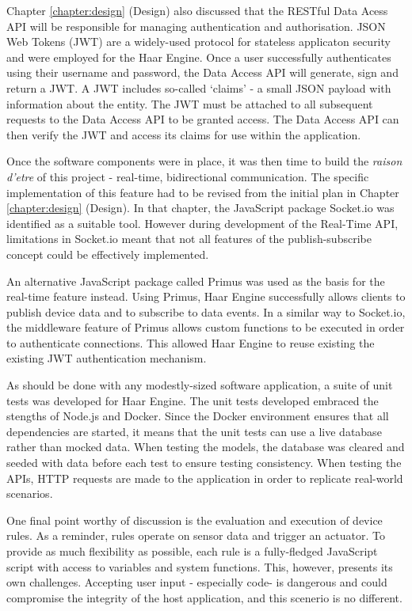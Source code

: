     Chapter \ref{chapter:design} (Design) also discussed that the RESTful Data Acess API will be responsible for managing authentication and authorisation. JSON Web Tokens (JWT) are a widely-used protocol for stateless applicaton security and were employed for the Haar Engine. Once a user successfully authenticates using their username and password, the Data Access API will generate, sign and return a JWT. A JWT includes so-called `claims' - a small JSON payload with information about the entity. The JWT must be attached to all subsequent requests to the Data Access API to be granted access. The Data Access API can then verify the JWT and access its claims for use within the application.

    Once the software components were in place, it was then time to build the \textit{raison d'etre} of this project - real-time, bidirectional communication. The specific implementation of this feature had to be revised from the initial plan in Chapter \ref{chapter:design} (Design). In that chapter, the JavaScript package Socket.io was identified as a suitable tool. However during development of the Real-Time API, limitations in Socket.io meant that not all features of the publish-subscribe concept could be effectively implemented.

    An alternative JavaScript package called Primus was used as the basis for the real-time feature instead. Using Primus, Haar Engine successfully allows clients to publish device data and to subscribe to data events. In a similar way to Socket.io, the middleware feature of Primus allows custom functions to be executed in order to authenticate connections. This allowed Haar Engine to reuse existing the existing JWT authentication mechanism.

    As should be done with any modestly-sized software application, a suite of unit tests was developed for Haar Engine. The unit tests developed embraced the stengths of Node.js and Docker. Since the Docker environment ensures that all dependencies are started, it means that the unit tests can use a live database rather than mocked data. When testing the models, the database was cleared and seeded with data before each test to ensure testing consistency. When testing the APIs, HTTP requests are made to the application in order to replicate real-world scenarios.

    One final point worthy of discussion is the evaluation and execution of device rules. As a reminder, rules operate on sensor data and trigger an actuator. To provide as much flexibility as possible, each rule is a fully-fledged JavaScript script with access to variables and system functions. This, however, presents its own challenges. Accepting user input - especially code- is dangerous and could compromise the integrity of the host application, and this scenerio is no different.

